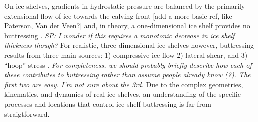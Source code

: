 \documentclass[review,oneside]{igs}
\begin{document}
On ice shelves, gradients in hydrostatic pressure are balanced by the primarily extensional flow of ice towards the calving front \citep{schoof2007}[add a more basic ref, like Paterson, Van der Veen?] and, in theory, a one-dimensional ice shelf provides no buttressing \citep{schoof2007,gudmundsson2013}. \textit{SP: I wonder if this requires a monotonic decrease in ice shelf thickness though?} For realistic, three-dimensional ice shelves however,  buttressing results from three main sources: 1) compressive ice flow 2) lateral shear, and 3) ``hoop'' stress \citep{pegler2012}. \textit{For completeness, we should probably briefly describe how each of these contributes to buttressing rather than assume people already know (?). The first two are easy. I'm not sure about the 3rd.} Due to the complex geometries, kinematics, and dynamics of real ice shelves, an understanding of the specific processes and locations that control ice shelf buttressing is far from straigtforward.
\end{document}
